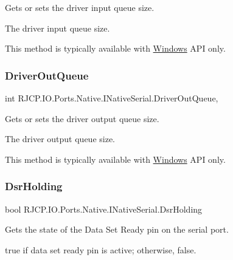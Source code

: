 Gets or sets the driver input queue size. 

The driver input queue size. 

This method is typically available with \mbox{\hyperlink{namespace_r_j_c_p_1_1_i_o_1_1_ports_1_1_native_1_1_windows}{Windows}} A\+PI only. \mbox{\label{interface_r_j_c_p_1_1_i_o_1_1_ports_1_1_native_1_1_i_native_serial_aab5690b25658e043d93b4a19e7b4a3b0}} 
\subsubsection{\texorpdfstring{DriverOutQueue}{DriverOutQueue}}
{\footnotesize\ttfamily int R\+J\+C\+P.\+I\+O.\+Ports.\+Native.\+I\+Native\+Serial.\+Driver\+Out\+Queue\hspace{0.3cm}{\ttfamily [get]}, {\ttfamily [set]}}



Gets or sets the driver output queue size. 

The driver output queue size. 

This method is typically available with \mbox{\hyperlink{namespace_r_j_c_p_1_1_i_o_1_1_ports_1_1_native_1_1_windows}{Windows}} A\+PI only. \mbox{\label{interface_r_j_c_p_1_1_i_o_1_1_ports_1_1_native_1_1_i_native_serial_aeea9f95865d4059b3d1119bc87841b91}} 
\subsubsection{\texorpdfstring{DsrHolding}{DsrHolding}}
{\footnotesize\ttfamily bool R\+J\+C\+P.\+I\+O.\+Ports.\+Native.\+I\+Native\+Serial.\+Dsr\+Holding\hspace{0.3cm}{\ttfamily [get]}}



Gets the state of the Data Set Ready pin on the serial port. 

{\ttfamily true} if data set ready pin is active; otherwise, {\ttfamily false}. \mbox{\label{interface_r_j_c_p_1_1_i_o_1_1_ports_1_1_native_1_1_i_native_serial_a78447c12bcc870a80da56697ec226ca1}} 
